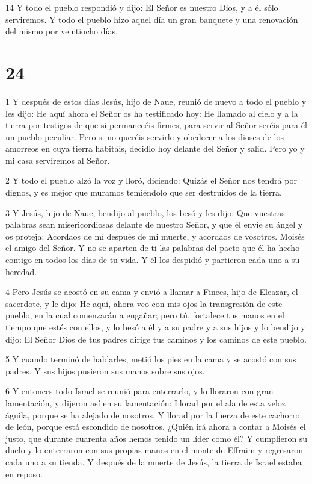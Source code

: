 \par 14 Y todo el pueblo respondió y dijo: El Señor es nuestro Dios, y a él sólo serviremos. Y todo el pueblo hizo aquel día un gran banquete y una renovación del mismo por veintiocho días.

\chapter{24}

\par 1 Y después de estos días Jesús, hijo de Naue, reunió de nuevo a todo el pueblo y les dijo: He aquí ahora el Señor os ha testificado hoy: He llamado al cielo y a la tierra por testigos de que si permanecéis firmes, para servir al Señor seréis para él un pueblo peculiar. Pero si no queréis servirle y obedecer a los dioses de los amorreos en cuya tierra habitáis, decidlo hoy delante del Señor y salid. Pero yo y mi casa serviremos al Señor.

\par 2 Y todo el pueblo alzó la voz y lloró, diciendo: Quizás el Señor nos tendrá por dignos, y es mejor que muramos temiéndolo que ser destruidos de la tierra.

\par 3 Y Jesús, hijo de Naue, bendijo al pueblo, los besó y les dijo: Que vuestras palabras sean misericordiosas delante de nuestro Señor, y que él envíe su ángel y os proteja: Acordaos de mí después de mi muerte, y acordaos de vosotros. Moisés el amigo del Señor. Y no se aparten de ti las palabras del pacto que él ha hecho contigo en todos los días de tu vida. Y él los despidió y partieron cada uno a su heredad.

\par 4 Pero Jesús se acostó en su cama y envió a llamar a Finees, hijo de Eleazar, el sacerdote, y le dijo: He aquí, ahora veo con mis ojos la transgresión de este pueblo, en la cual comenzarán a engañar; pero tú, fortalece tus manos en el tiempo que estés con ellos, y lo besó a él y a su padre y a sus hijos y lo bendijo y dijo: El Señor Dios de tus padres dirige tus caminos y los caminos de este pueblo.

\par 5 Y cuando terminó de hablarles, metió los pies en la cama y se acostó con sus padres. Y sus hijos pusieron sus manos sobre sus ojos.

\par 6 Y entonces todo Israel se reunió para enterrarlo, y lo lloraron con gran lamentación, y dijeron así en su lamentación: Llorad por el ala de esta veloz águila, porque se ha alejado de nosotros. Y llorad por la fuerza de este cachorro de león, porque está escondido de nosotros. ¿Quién irá ahora a contar a Moisés el justo, que durante cuarenta años hemos tenido un líder como él? Y cumplieron su duelo y lo enterraron con sus propias manos en el monte de Effraim y regresaron cada uno a su tienda. Y después de la muerte de Jesús, la tierra de Israel estaba en reposo.

